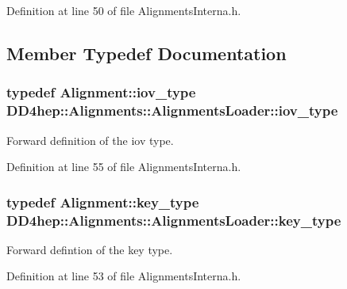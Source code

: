 Definition at line 50 of file AlignmentsInterna.h.

\subsection{Member Typedef Documentation}
\hypertarget{class_d_d4hep_1_1_alignments_1_1_alignments_loader_a632271e6cb9198528a0826d9082561d1}{
\subsubsection[{iov\_\-type}]{\setlength{\rightskip}{0pt plus 5cm}typedef {\bf Alignment::iov\_\-type} {\bf DD4hep::Alignments::AlignmentsLoader::iov\_\-type}}}
\label{class_d_d4hep_1_1_alignments_1_1_alignments_loader_a632271e6cb9198528a0826d9082561d1}


Forward definition of the iov type. 

Definition at line 55 of file AlignmentsInterna.h.\hypertarget{class_d_d4hep_1_1_alignments_1_1_alignments_loader_af56e6294e72dacbe001c1f24b8381d5d}{
\subsubsection[{key\_\-type}]{\setlength{\rightskip}{0pt plus 5cm}typedef {\bf Alignment::key\_\-type} {\bf DD4hep::Alignments::AlignmentsLoader::key\_\-type}}}
\label{class_d_d4hep_1_1_alignments_1_1_alignments_loader_af56e6294e72dacbe001c1f24b8381d5d}


Forward defintion of the key type. 

Definition at line 53 of file AlignmentsInterna.h.

